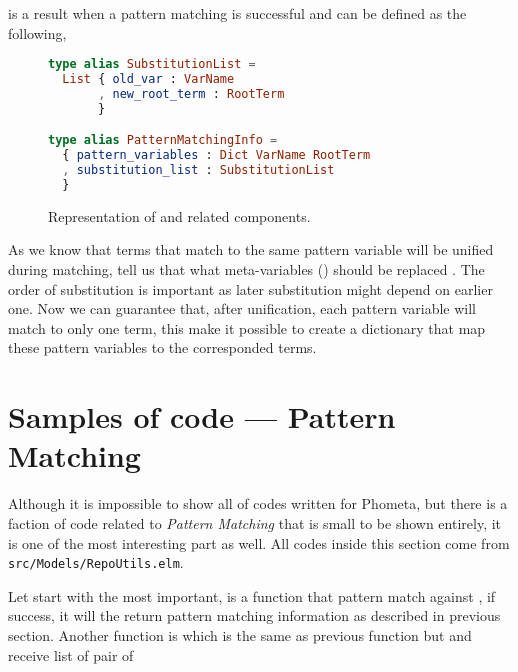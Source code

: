 \documentclass[master.tex]{subfiles}
\begin{document}
 is a result when a pattern matching is successful
and can be defined as the following,


\begin{figure}[H]
\begin{framed}
\begin{lstlisting}[language=elm]
type alias SubstitutionList =
  List { old_var : VarName
       , new_root_term : RootTerm
       }

type alias PatternMatchingInfo =
  { pattern_variables : Dict VarName RootTerm
  , substitution_list : SubstitutionList
  }
\end{lstlisting}
\end{framed}
\caption{Representation of  and related components.}
\label{fig:implementation-repo-pattern-matching-info}
\end{figure}

As we know that terms that match to the same pattern variable will be unified
during matching,  tell us that what meta-variables
() should be replaced . The order of
substitution is important as later substitution might depend on earlier one. Now
we can guarantee that, after unification, each pattern variable will match to
only one term, this make it possible to create a dictionary
 that map these pattern variables to the corresponded
terms.

\section{Samples of code --- Pattern Matching}
Although it is impossible to show all of codes written for Phometa, but there is
a faction of code related to \emph{Pattern Matching} that is small to be shown
entirely, it is one of the most interesting part as well. All codes inside this
section come from \texttt{src/Models/RepoUtils.elm}.

Let start with the most important,  is a function that
pattern match  against , if success, it will the
return pattern matching information as described in previous section. Another
function is  which is the same as previous
function but and receive list of pair of 
\end{document}
